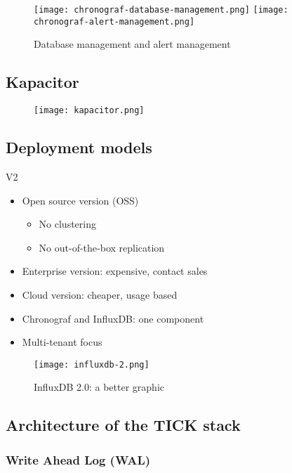\documentclass{article}
\begin{document}
\begin{figure}[H]
    \centering
    \texttt{[image: chronograf-database-management.png]}
    \texttt{[image: chronograf-alert-management.png]}
    \caption{Database management and alert management}
\end{figure}

\subsection{Kapacitor}

\begin{figure}[H]
    \centering
    \texttt{[image: kapacitor.png]}
    \caption{}
\end{figure}

\subsection{Deployment models}

V2

\begin{itemize}
    \item Open source version (OSS)
    \begin{itemize}
        \item No clustering
        \item No out-of-the-box replication
    \end{itemize}
    \item Enterprise version: expensive, contact sales
    \item Cloud version: cheaper, usage based
    \item Chronograf and InfluxDB: one component
    \item Multi-tenant focus
\end{itemize}

\begin{figure}[H]
    \centering
    \texttt{[image: influxdb-2.png]}
    \caption{InfluxDB 2.0: a better graphic}
\end{figure}

\subsection{Architecture of the TICK stack}

\subsubsection{Write Ahead Log (WAL)}
\end{document}
